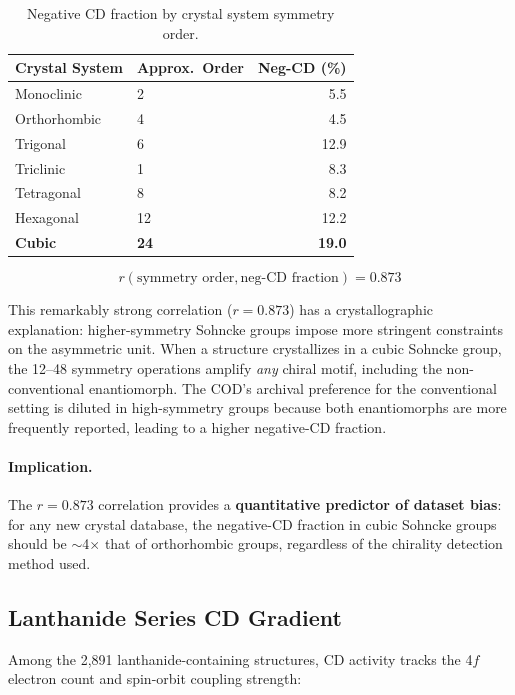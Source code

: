 \documentclass[11pt,a4paper]{article}
\begin{document}
\begin{table}[H]
\centering
\caption{Negative CD fraction by crystal system symmetry order.}
\label{tab:neg_sym}
\begin{tabular}{llr}
\toprule
Crystal System & Approx.\ Order & Neg-CD (\%) \\
\midrule
Monoclinic & 2 & 5.5 \\
Orthorhombic & 4 & 4.5 \\
Trigonal & 6 & 12.9 \\
Triclinic & 1 & 8.3 \\
Tetragonal & 8 & 8.2 \\
Hexagonal & 12 & 12.2 \\
\textbf{Cubic} & \textbf{24} & \textbf{19.0} \\
\bottomrule
\end{tabular}
\end{table}

\begin{equation}
r(\text{symmetry order}, \text{neg-CD fraction}) = 0.873
\end{equation}

\noindent This remarkably strong correlation ($r = 0.873$) has a crystallographic explanation: higher-symmetry Sohncke groups impose more stringent constraints on the asymmetric unit. When a structure crystallizes in a cubic Sohncke group, the 12--48 symmetry operations amplify \emph{any} chiral motif, including the non-conventional enantiomorph. The COD's archival preference for the conventional setting is diluted in high-symmetry groups because both enantiomorphs are more frequently reported, leading to a higher negative-CD fraction.

\paragraph{Implication.} The $r = 0.873$ correlation provides a \textbf{quantitative predictor of dataset bias}: for any new crystal database, the negative-CD fraction in cubic Sohncke groups should be $\sim$4$\times$ that of orthorhombic groups, regardless of the chirality detection method used.

\subsection{Lanthanide Series CD Gradient}

Among the 2,891 lanthanide-containing structures, CD activity tracks the 4$f$ electron count and spin-orbit coupling strength:
\end{document}
